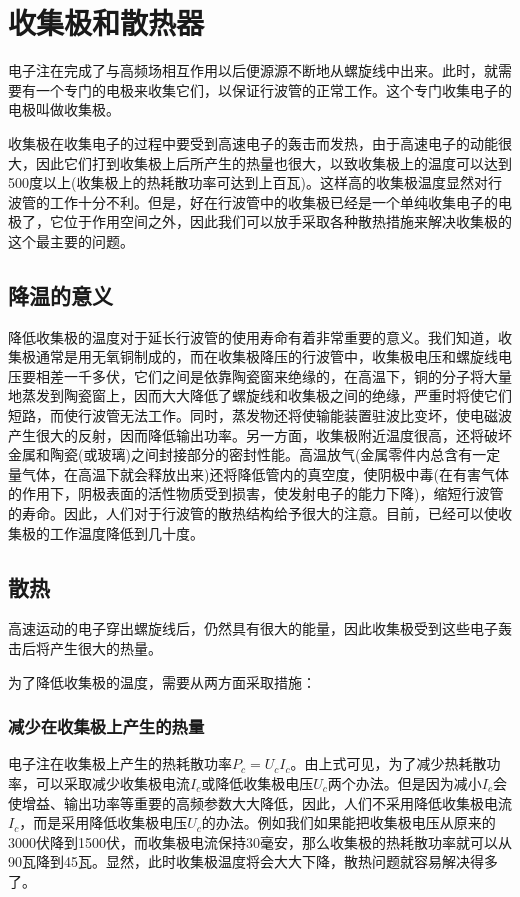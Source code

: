 \chapter{收集极和散热器}
电子注在完成了与高频场相互作用以后便源源不断地从螺旋线中出来。此时，就需要有一个专门的电极来收集它们，以保证行波管的正常工作。这个专门收集电子的电极叫做收集极。


收集极在收集电子的过程中要受到高速电子的轰击而发热，由于高速电子的动能很大，因此它们打到收集极上后所产生的热量也很大，以致收集极上的温度可以达到500度以上(收集极上的热耗散功率可达到上百瓦)。这样高的收集极温度显然对行波管的工作十分不利。但是，好在行波管中的收集极已经是一个单纯收集电子的电极了，它位于作用空间之外，因此我们可以放手采取各种散热措施来解决收集极的这个最主要的问题。

\section{降温的意义}

降低收集极的温度对于延长行波管的使用寿命有着非常重要的意义。我们知道，收集极通常是用无氧铜制成的，而在收集极降压的行波管中，收集极电压和螺旋线电压要相差一千多伏，它们之间是依靠陶瓷窗来绝缘的，在高温下，铜的分子将大量地蒸发到陶瓷窗上，因而大大降低了螺旋线和收集极之间的绝缘，严重时将使它们短路，而使行波管无法工作。同时，蒸发物还将使输能装置驻波比变坏，使电磁波产生很大的反射，因而降低输出功率。另一方面，收集极附近温度很高，还将破坏金属和陶瓷(或玻璃)之间封接部分的密封性能。高温放气(金属零件内总含有一定量气体，在高温下就会释放出来)还将降低管内的真空度，使阴极中毒(在有害气体的作用下，阴极表面的活性物质受到损害，使发射电子的能力下降)，缩短行波管的寿命。因此，人们对于行波管的散热结构给予很大的注意。目前，已经可以使收集极的工作温度降低到几十度。
\section{散热}
高速运动的电子穿出螺旋线后，仍然具有很大的能量，因此收集极受到这些电子轰击后将产生很大的热量。


为了降低收集极的温度，需要从两方面采取措施：


\subsection{减少在收集极上产生的热量}

电子注在收集极上产生的热耗散功率$ P_c = U_cI_c $。由上式可见，为了减少热耗散功率，可以采取减少收集极电流$ I_c $或降低收集极电压$ U_c $两个办法。但是因为减小$ I_c $会使增益、输出功率等重要的高频参数大大降低，因此，人们不采用降低收集极电流$ I_c $，而是采用降低收集极电压$ U_c $的办法。例如我们如果能把收集极电压从原来的3000伏降到1500伏，而收集极电流保持30毫安，那么收集极的热耗散功率就可以从90瓦降到45瓦。显然，此时收集极温度将会大大下降，散热问题就容易解决得多了。

